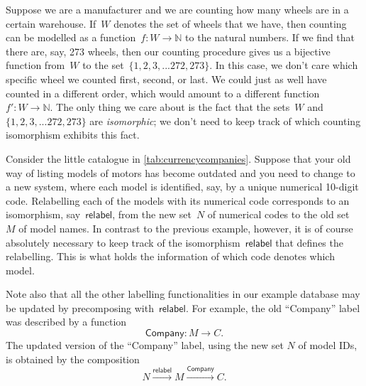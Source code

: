 \begin{example}[Sizes]
Suppose we are a manufacturer and we are counting how many wheels are in a certain warehouse. If~$W$ denotes the set of wheels that we have, then counting can be modelled as a function~$f\colon W \to \mathbb{N}$ to the natural numbers. If we find that there are, say, 273 wheels, then our counting procedure gives us a bijective function from~$W$ to the set~$\{1, 2, 3,... 272, 273 \}$. In this case, we don't care which specific wheel we counted first, second, or last. We could just as well have counted in a different order, which would amount to a different function~$f'\colon W \to \mathbb{N}$. The only thing we care about is the fact that the sets~$W$ and~$\{1, 2, 3,... 272, 273 \}$ are \emph{isomorphic}; we don't need to keep track of which counting isomorphism exhibits this fact.
\end{example}


\begin{example}[Relabelling]
Consider the little catalogue in \cref{tab:currencycompanies}. Suppose that your old way of listing models of motors has become outdated and you need to change to a new system, where each model is identified, say, by a unique numerical 10-digit code. Relabelling each of the models with its numerical code corresponds to an isomorphism, say~$\mathsf{relabel}$, from the new set~$N$ of numerical codes to the old set~$M$ of model names. In contrast to the previous example, however, it is of course absolutely necessary to keep track of the isomorphism~$\mathsf{relabel}$ that defines the relabelling. This is what holds the information of which code denotes which model.

Note also that all the other labelling functionalities in our example database may be updated by precomposing with~$\mathsf{relabel}$. For example, the old ``Company'' label was described by a function
\begin{equation*}
\mathsf{Company}\colon M \to C.
\end{equation*}
The updated version of the ``Company'' label, using the new set $N$ of model IDs, is obtained by the composition
\begin{equation*}
N \overset{\mathsf{relabel}}{\longrightarrow} M \overset{\mathsf{Company}}{\longrightarrow} C.
\end{equation*}
\end{example}




